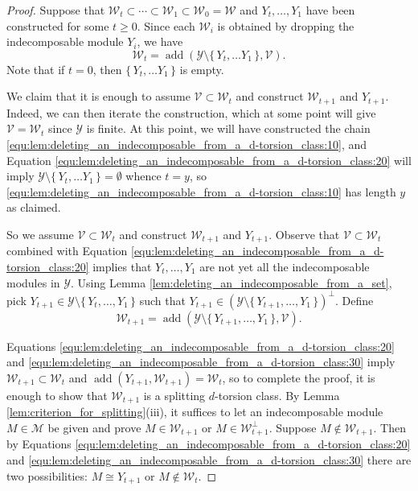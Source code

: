 \documentclass[12pt,reqno]{amsart}
\def\cM{\mathscr{M}}
\def\cV{\mathscr{V}}
\def\cW{\mathscr{W}}
\def\cY{\mathscr{Y}}
\def\add{\operatorname{add}}
\numberwithin{equation}{section}
\theoremstyle{definition}
\theoremstyle{theorem}
\theoremstyle{definition}
\begin{document}
\begin{proof}
Suppose that $\cW_t \subset \cdots \subset \cW_1 \subset \cW_0 = \cW$ and $Y_t, \ldots, Y_1$ have been constructed for some $t \geqslant 0$.  Since each $\cW_i$ is obtained by dropping the indecomposable module $Y_i$, we have
\begin{equation}
\label{equ:lem:deleting_an_indecomposable_from_a_d-torsion_class:20}
  \cW_t = \add( \cY \setminus \{\, Y_t, \ldots Y_1 \,\},\cV ).
\end{equation}
Note that if $t = 0$, then $\{\, Y_t, \ldots Y_1 \,\}$ is empty.

We claim that it is enough to assume $\cV \subset \cW_t$ and construct $\cW_{ t+1 }$ and $Y_{ t+1 }$.  Indeed, we can then iterate the construction, which at some point will give $\cV = \cW_t$ since $\cY$ is finite.  At this point, we will have constructed the chain \eqref{equ:lem:deleting_an_indecomposable_from_a_d-torsion_class:10}, and Equation \eqref{equ:lem:deleting_an_indecomposable_from_a_d-torsion_class:20} will imply $\cY \setminus \{\, Y_t, \ldots Y_1 \,\} = \emptyset$ whence $t = y$, so \eqref{equ:lem:deleting_an_indecomposable_from_a_d-torsion_class:10} has length $y$ as claimed.

So we assume $\cV \subset \cW_t$ and construct $\cW_{ t+1 }$ and $Y_{ t+1 }$.  Observe that $\cV \subset \cW_t$ combined with Equation \eqref{equ:lem:deleting_an_indecomposable_from_a_d-torsion_class:20} implies that $Y_t, \ldots, Y_1$ are not yet all the indecomposable modules in $\cY\!$.  Using Lemma \ref{lem:deleting_an_indecomposable_from_a_set}, pick $Y_{ t+1 } \in \cY \setminus \{\, Y_t, \ldots, Y_1 \,\}$ such that $Y_{ t+1 } \in ( \cY \setminus \{\, Y_{ t+1 }, \ldots, Y_1 \,\} )^{ \perp }$.  Define
\begin{equation}
\label{equ:lem:deleting_an_indecomposable_from_a_d-torsion_class:30}
  \cW_{ t+1 } = \add( \cY \setminus \{\, Y_{ t+1 }, \ldots, Y_1 \,\},\cV ).
\end{equation}

Equations \eqref{equ:lem:deleting_an_indecomposable_from_a_d-torsion_class:20} and \eqref{equ:lem:deleting_an_indecomposable_from_a_d-torsion_class:30} imply $\cW_{ t+1 } \subset \cW_t$ and $\add( Y_{ t+1 },\cW_{ t+1 } ) = \cW_t$, so to complete the proof, it is enough to show that $\cW_{ t+1 }$ is a splitting $d$-torsion class.  By Lemma \ref{lem:criterion_for_splitting}(iii), it suffices to let an indecomposable module $M \in \cM$ be given and prove $M \in \cW_{ t+1 }$ or $M \in \cW_{ t+1 }^{ \perp }$.  Suppose $M \not\in \cW_{ t+1 }$.  Then by Equations \eqref{equ:lem:deleting_an_indecomposable_from_a_d-torsion_class:20} and \eqref{equ:lem:deleting_an_indecomposable_from_a_d-torsion_class:30} there are two possibilities: $M \cong Y_{ t+1 }$ or $M \not\in \cW_t$.  


\end{proof}
\end{document}
